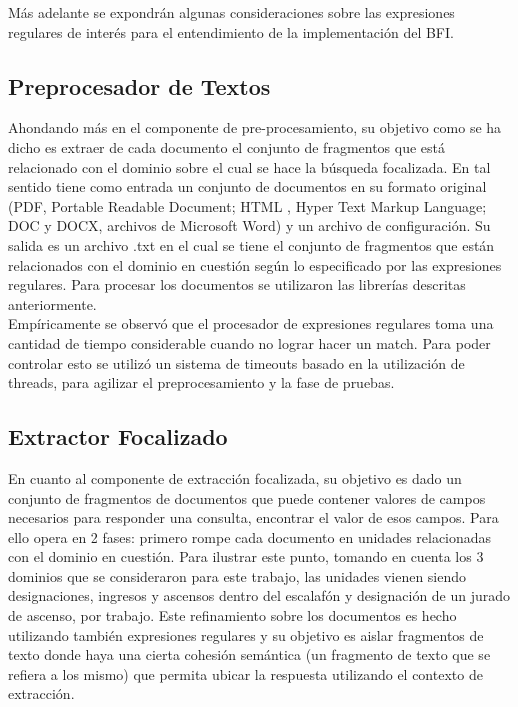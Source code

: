 Más adelante se expondrán algunas consideraciones sobre las expresiones regulares de interés para el entendimiento de la implementación del BFI. \\

\subsection{Preprocesador de Textos}\label{sect:implementacion-preProcesador}

Ahondando más en el componente de pre-procesamiento, su objetivo como se ha dicho es extraer de cada documento el conjunto de fragmentos que está relacionado con el dominio sobre el cual se hace la búsqueda focalizada. En tal sentido tiene como entrada un conjunto de documentos en su formato original (PDF, Portable Readable Document; HTML , Hyper Text Markup Language; DOC y DOCX, archivos de Microsoft Word) y un archivo de configuración. Su salida es un archivo .txt en el cual se tiene el conjunto de fragmentos que están relacionados con el dominio en cuestión según lo especificado por las expresiones regulares. Para procesar los documentos se utilizaron las librerías descritas anteriormente. \\

Empíricamente se observó que el procesador de expresiones regulares toma una cantidad de tiempo considerable cuando no lograr hacer un match. Para poder controlar esto se utilizó un sistema de timeouts basado en la utilización de threads, para agilizar el preprocesamiento y la fase de pruebas. \\

\subsection{Extractor Focalizado}\label{sect:implementacion-extractorFocalizado}

En cuanto al componente de extracción focalizada, su objetivo es dado un conjunto de fragmentos de documentos que puede contener valores de campos necesarios para responder una consulta, encontrar el valor de esos campos. Para ello opera en 2 fases: primero rompe cada documento en unidades relacionadas con el dominio en cuestión. Para ilustrar este punto, tomando en cuenta los 3 dominios que se consideraron para este trabajo, las unidades vienen siendo designaciones, ingresos y ascensos dentro del escalafón y designación de un jurado de ascenso, por trabajo. Este refinamiento sobre los documentos es hecho utilizando también expresiones regulares y su objetivo es aislar fragmentos de texto donde haya una cierta cohesión semántica (un fragmento de texto que se refiera a los mismo) que permita ubicar la respuesta utilizando el contexto de extracción. \\

